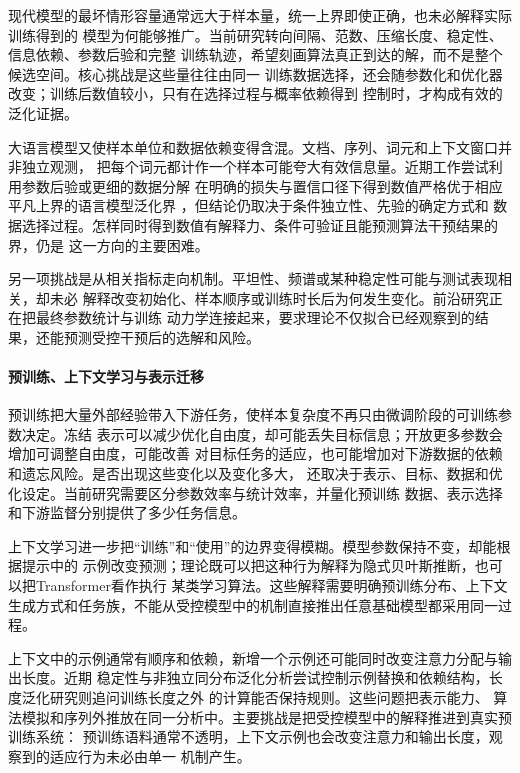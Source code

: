 现代模型的最坏情形容量通常远大于样本量，统一上界即使正确，也未必解释实际训练得到的
模型为何能够推广。当前研究转向间隔、范数、压缩长度、稳定性、信息依赖、参数后验和完整
训练轨迹，希望刻画算法真正到达的解，而不是整个候选空间。核心挑战是这些量往往由同一
训练数据选择，还会随参数化和优化器改变；训练后数值较小，只有在选择过程与概率依赖得到
控制时，才构成有效的泛化证据。

大语言模型又使样本单位和数据依赖变得含混。文档、序列、词元和上下文窗口并非独立观测，
把每个词元都计作一个样本可能夸大有效信息量。近期工作尝试利用参数后验或更细的数据分解
在明确的损失与置信口径下得到数值严格优于相应平凡上界的语言模型泛化界
，但结论仍取决于条件独立性、先验的确定方式和
数据选择过程。怎样同时得到数值有解释力、条件可验证且能预测算法干预结果的界，仍是
这一方向的主要困难。

另一项挑战是从相关指标走向机制。平坦性、频谱或某种稳定性可能与测试表现相关，却未必
解释改变初始化、样本顺序或训练时长后为何发生变化。前沿研究正在把最终参数统计与训练
动力学连接起来，要求理论不仅拟合已经观察到的结果，还能预测受控干预后的选解和风险。

\paragraph{预训练、上下文学习与表示迁移}

预训练把大量外部经验带入下游任务，使样本复杂度不再只由微调阶段的可训练参数决定。冻结
表示可以减少优化自由度，却可能丢失目标信息；开放更多参数会增加可调整自由度，可能改善
对目标任务的适应，也可能增加对下游数据的依赖和遗忘风险。是否出现这些变化以及变化多大，
还取决于表示、目标、数据和优化设定。当前研究需要区分参数效率与统计效率，并量化预训练
数据、表示选择和下游监督分别提供了多少任务信息。

上下文学习进一步把“训练”和“使用”的边界变得模糊。模型参数保持不变，却能根据提示中的
示例改变预测；理论既可以把这种行为解释为隐式贝叶斯推断，也可以把Transformer看作执行
某类学习算法。这些解释需要明确预训练分布、上下文
生成方式和任务族，不能从受控模型中的机制直接推出任意基础模型都采用同一过程。

上下文中的示例通常有顺序和依赖，新增一个示例还可能同时改变注意力分配与输出长度。近期
稳定性与非独立同分布泛化分析尝试控制示例替换和依赖结构，长度泛化研究则追问训练长度之外
的计算能否保持规则。这些问题把表示能力、
算法模拟和序列外推放在同一分析中。主要挑战是把受控模型中的解释推进到真实预训练系统：
预训练语料通常不透明，上下文示例也会改变注意力和输出长度，观察到的适应行为未必由单一
机制产生。

